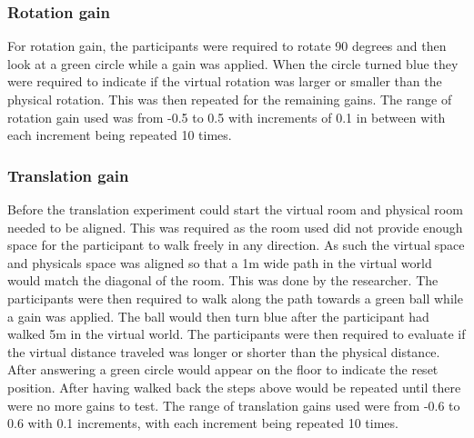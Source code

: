 \subsubsection{Rotation gain}
For rotation gain, the participants were required to rotate 90 degrees and then look at a green circle while a gain was applied. When the circle turned blue they were required to indicate if the virtual rotation was larger or smaller than the physical rotation. This was then repeated for the remaining gains. The range of rotation gain used was from -0.5 to 0.5 with increments of 0.1 in between with each increment being repeated 10 times.

\subsubsection{Translation gain}
Before the translation experiment could start the virtual room and physical room needed to be aligned. This was required as the room used did not provide enough space for the participant to walk freely in any direction. As such the virtual space and physicals space was aligned so that a 1m wide path in the virtual world would match the diagonal of the room. This was done by the researcher. The participants were then required to walk along the path towards a green ball while a gain was applied. The ball would then turn blue after the participant had walked 5m in the virtual world. The participants were then required to evaluate if the virtual distance traveled was longer or shorter than the physical distance. After answering a green circle would appear on the floor to indicate the reset position. After having walked back the steps above would be repeated until there were no more gains to test. The range of translation gains used were from -0.6 to 0.6 with 0.1 increments, with each increment being repeated 10 times.

